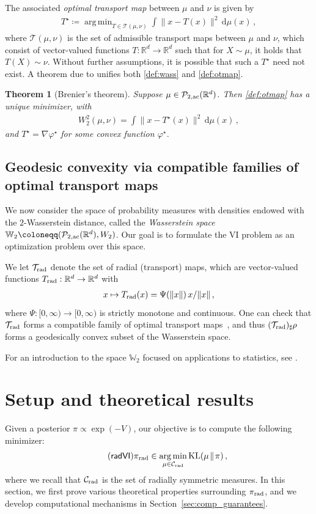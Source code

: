 \documentclass[twoside]{article}
\newcommand{\cC}{\mathcal{C}}
\newcommand{\cP}{\mathcal{P}}
\newcommand{\cT}{\mathcal{T}}
\newcommand{\WW}{\mathbb{W}}
\newcommand{\1}{\mathds{1}}
\newcommand{\kl}[2]{\KL(#1 \!\;\|\; \!#2)}
\newcommand{\R}{\mathbb{R}}
\renewcommand{\phi}{\varphi}
\newcommand*{\defeq}{\coloneqq}
\newcommand*{\rd}{\mathrm{d}}
\newcommand*{\dd}{\, \rd}
\DeclareMathOperator*{\argmin}{arg\,min}
\DeclareMathOperator*{\KL}{KL}
\newcommand{\pirad}{\pi_{\rm rad}}
\newcommand{\Crad}{\cC_{\rm rad}}
\theoremstyle{plain}
\newtheorem{theorem}{Theorem}[section]
\theoremstyle{definition}
\theoremstyle{remark}
\begin{document}
The associated \emph{optimal transport map} between $\mu$ and $\nu$ is given by
\begin{align}\label{def:otmap}
    T^\star \defeq \argmin_{T \in \cT(\mu,\nu)} \int \|x - T(x)\|^2 \dd \mu(x)\,,
\end{align}
where $\cT(\mu,\nu)$ is the set of admissible transport maps between $\mu$ and $\nu$, which consist of vector-valued functions $T :\R^d \to \R^d$ such that for $X\sim\mu$, it holds that $T(X)\sim\nu$. Without further assumptions, it is possible that such a $T^\star$ need not exist. A theorem due to \citet{brenier1991polar} unifies both \eqref{def:wass} and \eqref{def:otmap}.
\begin{theorem}[Brenier's theorem]
Suppose $\mu \in \cP_{2,\rm{ac}}(\R^d)$. Then \eqref{def:otmap} has a unique minimizer, with
\begin{align*}
    W_2^2(\mu,\nu) = \int \|x - T^\star(x)\|^2 \dd \mu(x)\,,
\end{align*}    
and $T^\star = \nabla \phi^\star$ for some convex function $\phi^\star$. 
\end{theorem}

\subsection{Geodesic convexity via compatible families of optimal transport maps}
We now consider the space of probability measures with densities endowed with the $2$-Wasserstein distance, called the \emph{Wasserstein space} $\WW_2 \defeq (\cP_{2,\rm{ac}}(\R^d), W_2)$.
Our goal is to formulate the VI problem as an optimization problem over this space.



We let $\cT_{\rm rad}$ denote the set of radial (transport) maps, which are vector-valued functions $T_{\rm rad}:\R^d\to\R^d$ with
\begin{align}
    x \mapsto T_{\rm rad}(x) = {\Psi(\|x\|)\,x/\|x\|}\,,
\end{align}
where $\Psi : [0,\infty) \to [0,\infty) $ is strictly monotone and continuous. One can check that $\cT_{\rm rad}$ forms a compatible family of optimal transport maps~\citep[see][Section~2.3.2]{panaretos2020invitation}, and thus $(\cT_{\rm rad})_\sharp\rho$ forms a geodesically convex subset of the Wasserstein space. 

For an introduction to the space $\WW_2$ focused on applications to statistics, see \cite{panaretos2020invitation,CheNilRig25OT}.

\section{Setup and theoretical results}\label{sec:setup_theory}
Given a posterior $\pi \propto \exp(-V)$, our objective is to compute the following minimizer:
\begin{align}\label{eq:radvi}\tag{$\mathsf{radVI}$}
    \pi_{\rm rad} \in \argmin_{\mu \in \Crad} \kl{\mu}{\pi}\,,
\end{align}
where we recall that $\Crad$ is the set of radially symmetric measures. In this section, we first prove various theoretical properties surrounding $\pirad$, and we develop computational mechanisms in Section~\ref{sec:comp_guarantees}.
\end{document}
